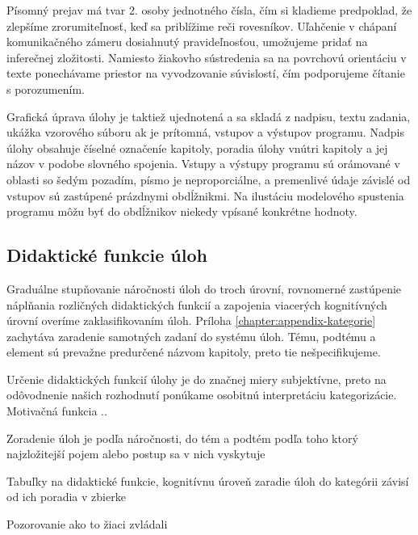  
Písomný prejav má tvar 2. osoby jednotného čísla, čím si kladieme predpoklad, že zlepšíme zrorumiteľnosť, keď sa priblížime reči rovesníkov. Uľahčenie v chápaní komunikačného zámeru dosiahnutý pravideľnosťou, umožujeme pridať na inferečnej zložitosti. Namiesto žiakovho sústredenia sa na povrchovú orientáciu v texte ponechávame priestor na vyvodzovanie súvislostí, čím podporujeme čítanie s porozumením. 

Grafická úprava úlohy je taktiež ujednotená a sa skladá z nadpisu, textu zadania, ukážka vzorového súboru ak je prítomná, vstupov a výstupov programu. Nadpis úlohy obsahuje číselné označeníe kapitoly, poradia úlohy vnútri kapitoly a jej názov v podobe slovného spojenia.
Vstupy a výstupy programu sú orámované v oblasti so šedým pozadím, písmo je neproporciálne, a premenlivé údaje závislé od vstupov sú zastúpené prázdnymi obdĺžnikmi. Na ilustáciu modelového spustenia programu môžu byť do obdĺžnikov niekedy vpísané konkrétne hodnoty.


\subsection{Didaktické funkcie úloh}
Graduálne stupňovanie náročnosti úloh do troch úrovní, rovnomerné zastúpenie náplňania rozličných didaktických funkcií a zapojenia viacerých kognitívných úrovní overíme zaklasifikovaním úloh. Príloha \ref{chapter:appendix-kategorie} zachytáva zaradenie samotných zadaní do systému úloh. Tému, podtému a element sú prevažne predurčené názvom kapitoly, preto tie nešpecifikujeme. 

Určenie didaktických funkcií úlohy je do značnej miery subjektívne, preto na odôvodnenie našich rozhodnutí ponúkame osobitnú interpretáciu kategorizácie. Motivačná funkcia ..

Zoradenie úloh je podľa náročnosti, do tém a podtém podľa toho ktorý najzložitejší pojem alebo postup sa v nich vyskytuje

Tabuľky na didaktické funkcie, kognitívnu úroveň
zaradie úloh do kategórii závisí od ich poradia v zbierke


Pozorovanie ako to žiaci zvládali




